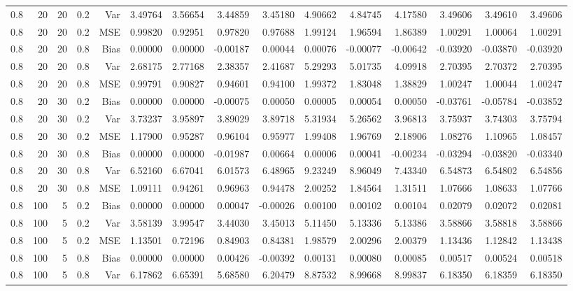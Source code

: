 \begin{table}[!htbp]
\begin{tabular}{lrrrrrrrrrrrrrr}
0.8 &  20 & 20 & 0.2 & Var & 3.49764 & 3.56654 & 3.44859 & 3.45180 & 4.90662 & 4.84745 & 4.17580 & 3.49606 & 3.49610 & 3.49606 \\
0.8 &  20 & 20 & 0.2 & MSE & 0.99820 & 0.92951 & 0.97820 & 0.97688 & 1.99124 & 1.96594 & 1.86389 & 1.00291 & 1.00064 & 1.00291 \\
0.8 &  20 & 20 & 0.8 & Bias & 0.00000 & 0.00000 & -0.00187 & 0.00044 & 0.00076 & -0.00077 & -0.00642 & -0.03920 & -0.03870 & -0.03920 \\
0.8 &  20 & 20 & 0.8 & Var & 2.68175 & 2.77168 & 2.38357 & 2.41687 & 5.29293 & 5.01735 & 4.09918 & 2.70395 & 2.70372 & 2.70395 \\
0.8 &  20 & 20 & 0.8 & MSE & 0.99791 & 0.90827 & 0.94601 & 0.94100 & 1.99372 & 1.83048 & 1.38829 & 1.00247 & 1.00044 & 1.00247 \\
0.8 &  20 & 30 & 0.2 & Bias & 0.00000 & 0.00000 & -0.00075 & 0.00050 & 0.00005 & 0.00054 & 0.00050 & -0.03761 & -0.05784 & -0.03852 \\
0.8 &  20 & 30 & 0.2 & Var & 3.73237 & 3.95897 & 3.89029 & 3.89718 & 5.31934 & 5.26562 & 3.96813 & 3.75937 & 3.74303 & 3.75794 \\
0.8 &  20 & 30 & 0.2 & MSE & 1.17900 & 0.95287 & 0.96104 & 0.95977 & 1.99408 & 1.96769 & 2.18906 & 1.08276 & 1.10965 & 1.08457 \\
0.8 &  20 & 30 & 0.8 & Bias & 0.00000 & 0.00000 & -0.01987 & 0.00664 & 0.00006 & 0.00041 & -0.00234 & -0.03294 & -0.03820 & -0.03340 \\
0.8 &  20 & 30 & 0.8 & Var & 6.52160 & 6.67041 & 6.01573 & 6.48965 & 9.23249 & 8.96049 & 7.43340 & 6.54873 & 6.54802 & 6.54856 \\
0.8 &  20 & 30 & 0.8 & MSE & 1.09111 & 0.94261 & 0.96963 & 0.94478 & 2.00252 & 1.84564 & 1.31511 & 1.07666 & 1.08633 & 1.07766 \\
0.8 & 100 &  5 & 0.2 & Bias & 0.00000 & 0.00000 & 0.00047 & -0.00026 & 0.00100 & 0.00102 & 0.00104 & 0.02079 & 0.02072 & 0.02081 \\
0.8 & 100 &  5 & 0.2 & Var & 3.58139 & 3.99547 & 3.44030 & 3.45013 & 5.11450 & 5.13336 & 5.13386 & 3.58866 & 3.58818 & 3.58866 \\
0.8 & 100 &  5 & 0.2 & MSE & 1.13501 & 0.72196 & 0.84903 & 0.84381 & 1.98579 & 2.00296 & 2.00379 & 1.13436 & 1.12842 & 1.13438 \\
0.8 & 100 &  5 & 0.8 & Bias & 0.00000 & 0.00000 & 0.00426 & -0.00392 & 0.00131 & 0.00080 & 0.00085 & 0.00517 & 0.00524 & 0.00518 \\
0.8 & 100 &  5 & 0.8 & Var & 6.17862 & 6.65391 & 5.68580 & 6.20479 & 8.87532 & 8.99668 & 8.99837 & 6.18350 & 6.18359 & 6.18350 \\

\end{tabular}
\end{table}
